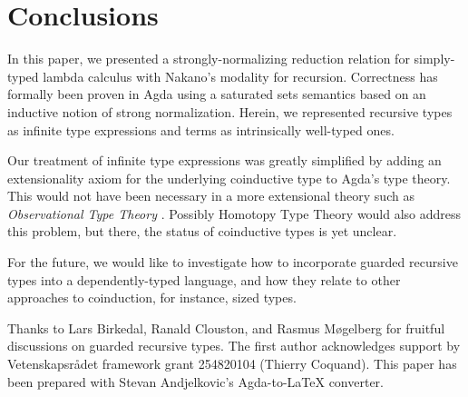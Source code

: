
\section{Conclusions}
\label{sec:concl}

In this paper, we presented a strongly-normalizing reduction relation
for simply-typed lambda calculus with Nakano's modality for
recursion.  Correctness has formally been proven in Agda using a
saturated sets semantics based on an inductive notion of strong
normalization.  Herein, we represented recursive types as infinite
type expressions and terms as intrinsically well-typed ones.  

Our treatment of infinite type expressions was greatly simplified by
adding an extensionality axiom for the underlying coinductive type to
Agda's type theory.  This would not have been necessary in a more
extensional theory such as \emph{Observational Type Theory}
\citep{altenkirchMcBrideSwierstra:plpv07}.  Possibly Homotopy Type
Theory \cite{hott} 
would also address this problem, but there, the status of
coinductive types is yet unclear.

For the future, we would like to investigate how to incorporate
guarded recursive types into a dependently-typed language, and how
they relate to other approaches to coinduction, for instance, sized
types.

Thanks to Lars Birkedal, Ranald Clouston, and Rasmus M\o{}gelberg for
fruitful discussions on guarded recursive types.
The first author acknowledges support by Vetenskapsr\aa{}det framework
grant 254820104 (Thierry Coquand).  This paper has been prepared with
Stevan Andjelkovic's Agda-to-LaTeX converter. 


